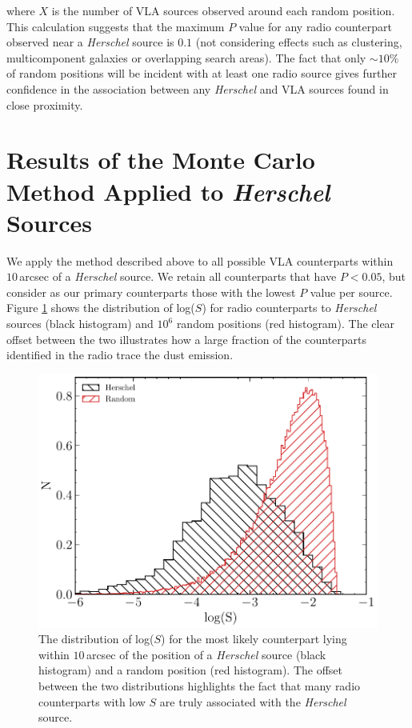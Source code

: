 \noindent where $X$ is the number of VLA sources observed around each random position. This calculation suggests that the maximum $P$ value for any radio counterpart observed near a \textit{Herschel} source is $0.1$ (not considering effects such as clustering, multicomponent galaxies or overlapping search areas). The fact that only $\sim 10\%$ of random positions will be incident with at least one radio source gives further confidence in the association between any \textit{Herschel} and VLA sources found in close proximity.

\section{Results of the Monte Carlo Method Applied to \textit{Herschel} Sources}

We apply the method described above to all possible VLA counterparts within $10\,$arcsec of a \textit{Herschel} source. We retain all counterparts that have $P < 0.05$, but consider as our primary counterparts those with the lowest $P$ value per source. Figure \ref{fig:ds_distributions} shows the distribution of log($S$) for radio counterparts to \textit{Herschel} sources (black histogram) and $10^6$ random positions (red histogram). The clear offset between the two illustrates how a large fraction of the counterparts identified in the radio trace the dust emission.

\begin{figure}
	\centering
	\includegraphics[width=0.8\columnwidth]{Figures/ds_distributions.pdf}
	\caption[Distribution of log($S$) for \textit{Herschel} sources and random positions]{The distribution of log($S$) for the most likely counterpart lying within $10\,$arcsec of the position of a \textit{Herschel} source (black histogram) and a random position (red histogram). The offset between the two distributions highlights the fact that many radio counterparts with low $S$ are truly associated with the \textit{Herschel} source.}
	\label{fig:ds_distributions}
\end{figure}

